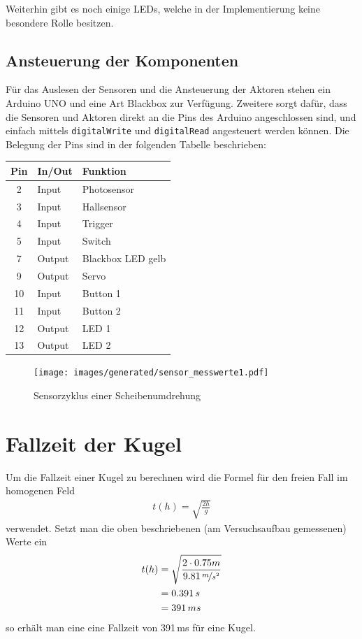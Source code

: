 Weiterhin gibt es noch einige LEDs, welche in der Implementierung keine besondere Rolle besitzen.

\subsection{Ansteuerung der Komponenten}
Für das Auslesen der Sensoren und die Ansteuerung der Aktoren stehen ein Arduino UNO und eine Art Blackbox zur Verfügung.
Zweitere sorgt dafür, dass die Sensoren und Aktoren direkt an die Pins des Arduino angeschlossen sind, und einfach mittels \texttt{digitalWrite} und \texttt{digitalRead} angesteuert werden können.
Die Belegung der Pins sind in der folgenden Tabelle beschrieben:

\begin{center}
\begin{tabular}{cll} 
	\textbf{Pin} 	& \textbf{In/Out} & \textbf{Funktion}	\\
	\toprule
	2 &	Input &	Photosensor \\
	3 &	Input &	Hallsensor\\
	4 &	Input &	Trigger\\
	5 &	Input &	Switch\\
	7 &	Output &	Blackbox LED gelb\\
	9 &	Output &	Servo\\
	10 &	Input &	Button 1\\
	11 &	Input &	Button 2\\
	12 &	Output &	LED 1\\
	13 &	Output &	LED 2\\
	\bottomrule
\end{tabular}
\end{center}

\begin{figure}[h] \centering
	\texttt{[image: images/generated/sensor\_messwerte1.pdf]}
	\caption{Sensorzyklus einer Scheibenumdrehung}
	\label{img:sensorwerte}
\end{figure}

\section{Fallzeit der Kugel}\label{analyse_fallzeit}
Um die Fallzeit einer Kugel zu berechnen wird die Formel für den freien Fall im homogenen Feld
\begin{align}
	t(h) = \sqrt{\frac{2h}{g}}
\end{align}
verwendet.
Setzt man die oben beschriebenen (am Versuchsaufbau gemessenen) Werte ein
\begin{align}
t(h) &= \sqrt{\frac{2 \cdot 0.75m}{9.81\,\nicefrac{m}{s^2}}} \\
	 &= 0.391\,s \\
	 &= 391\,ms
\end{align}
so erhält man eine eine Fallzeit von 391\,ms für eine Kugel.

